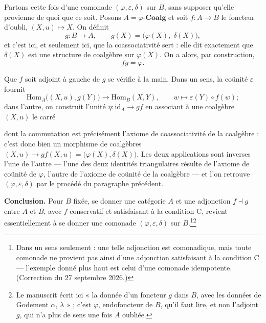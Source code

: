 \documentclass[11pt,a4paper]{article}
\begin{document}
Partons cette fois d'une comonade $(\varphi, \varepsilon, \delta)$ sur $B$,
sans supposer qu'elle provienne de quoi que ce soit. Posons
$A = \varphi\text{-}\mathbf{Coalg}$ et soit $f : A \to B$ le foncteur d'oubli,
$(X, u) \mapsto X$. On définit
\[
  g : B \longrightarrow A , \qquad
  g(X) = \bigl( \varphi(X),\; \delta(X) \bigr) ,
\]
et c'est ici, et seulement ici, que la coassociativité sert : elle dit
exactement que $\delta(X)$ est une structure de coalgèbre sur $\varphi(X)$. On
a alors, par construction,
\[
  fg = \varphi .
\]

Que $f$ soit adjoint à gauche de $g$ se vérifie à la main. Dans un sens, la
coünité $\varepsilon$ fournit
\[
  \mathrm{Hom}_{A}\bigl( (X,u), g(Y) \bigr) \longrightarrow
  \mathrm{Hom}_{B}(X, Y) , \qquad w \longmapsto \varepsilon(Y) \circ f(w) ;
\]
dans l'autre, on construit l'unité $\eta : \mathrm{id}_{A} \to gf$ en associant
à une coalgèbre $(X,u)$ le carré


dont la commutation est précisément l'axiome de coassociativité de la
coalgèbre : c'est donc bien un morphisme de coalgèbres
$(X,u) \to gf(X,u) = \bigl( \varphi(X), \delta(X) \bigr)$. Les deux
applications sont inverses l'une de l'autre — l'une des deux identités
triangulaires résulte de l'axiome de coünité de $\varphi$, l'autre de l'axiome
de coünité de la coalgèbre — et l'on retrouve $(\varphi, \varepsilon, \delta)$
par le procédé du paragraphe précédent.

\textbf{Conclusion.} Pour $B$ fixée, se donner une catégorie $A$ et une
adjonction $f \dashv g$ entre $A$ et $B$, avec $f$ conservatif et satisfaisant
à la condition C, revient essentiellement à se donner une comonade
$(\varphi, \varepsilon, \delta)$ sur $B$.\footnote{Dans un sens seulement : une telle adjonction est comonadique, mais toute comonade ne provient pas ainsi d'une adjonction satisfaisant à la condition C --- l'exemple donné plus haut est celui d'une comonade idempotente. (Correction du 27 septembre 2026.)}\footnote{Le manuscrit écrit ici « la
donnée d'un foncteur $g$ dans $B$, avec les données de Godement $\alpha$,
$\lambda$ » ; c'est $\varphi$, endofoncteur de $B$, qu'il faut lire, et non
l'adjoint $g$, qui n'a plus de sens une fois $A$ oubliée.}
\end{document}
